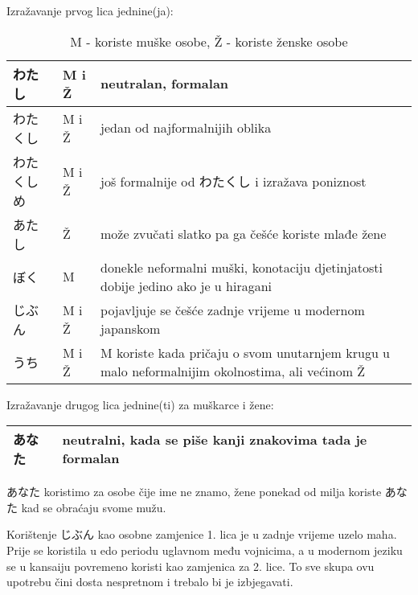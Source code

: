 
\author{Tomislav Mamić, Željka Ludošan}
\usepackage{graphicx}
\usepackage{caption}


	
		
	Izražavanje prvog lica jednine(ja):
	\begin{table}[!h]	
	\begin{tabular}{|l|l|p{400pt}|}
		\hline
		わたし		&M i Ž	&neutralan, formalan\\\hline
		わたくし	&M i Ž	&jedan od najformalnijih oblika\\\hline
		わたくしめ	&M i Ž	&još formalnije od わたくし i izražava poniznost\\\hline
		あたし		&Ž	&može zvučati slatko pa ga češće koriste mlađe žene\\\hline
		ぼく		&M	&donekle neformalni muški, konotaciju djetinjatosti dobije jedino ako je u hiragani\\\hline
		じぶん		&M i Ž	&pojavljuje se češće zadnje vrijeme u modernom japanskom\\\hline
		うち		&M i Ž	&M koriste kada pričaju o svom unutarnjem krugu u malo neformalnijim okolnostima, ali većinom Ž\\\hline
	\end{tabular}
	\caption*{M - koriste muške osobe, Ž - koriste ženske osobe}
	\end{table}

	
	Izražavanje drugog lica jednine(ti) za muškarce i žene:
	\begin{table}[!h]
	\begin{tabular}{|l|l|}
		\hline
		あなた&neutralni, kada se piše kanji znakovima tada je formalan\\\hline
	\end{tabular}
	\end{table}
		
	あなた koristimo za osobe čije ime ne znamo, žene ponekad od milja koriste あなた kad se obraćaju svome mužu.
	
	Korištenje じぶん kao osobne zamjenice 1. lica je u zadnje vrijeme uzelo maha. Prije se koristila u edo periodu uglavnom među vojnicima, a u modernom jeziku se u kansaiju povremeno koristi kao zamjenica za 2. lice. To sve skupa ovu upotrebu čini dosta nespretnom i trebalo bi je izbjegavati.
	
